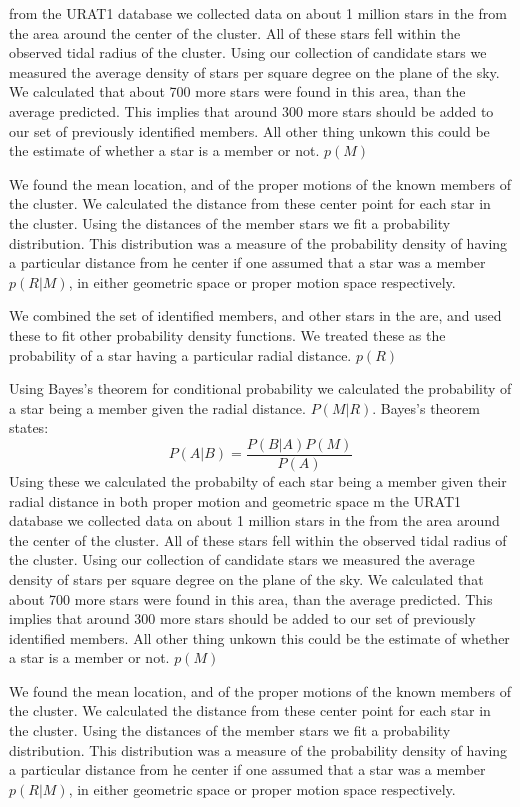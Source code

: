 \documentclass[12pt]{article}
\begin{document}
\huge{from the URAT1 database we collected data on about 1 million stars in the from the area around the center of the cluster.  All of these stars fell within the observed tidal radius of the cluster.  Using our collection of candidate stars we measured the average density of stars per square degree on the plane of the sky.  We calculated that about 700 more stars were found in this area, than the average predicted.  This implies that around 300 more stars should be added to our set of previously identified members.  All other thing unkown this could be the estimate of whether a star is a member or not. $p(M)$

We found the mean location, and of the proper motions of the known members of the cluster. We calculated the distance from these center point for each star in the cluster.  Using the distances of the member stars we fit a probability distribution.  This distribution was a measure of the probability density of having a particular distance from he center if one assumed that a star was a member $p(R|M)$, in either geometric space or proper motion space respectively.  

We combined the set of identified members, and other stars in the are, and used these to fit other probability density functions.  We treated these as the probability of a star having a particular radial distance. $p(R)$ 

Using Bayes's theorem for conditional probability we calculated the probability of a star being a member given the radial distance. $P(M|R)$. Bayes's theorem states:
\begin{equation}
P(A|B)=\frac{P(B|A)P(M)}{P(A)}
\end{equation}
Using these we calculated the probabilty of each star being a member given their radial distance in both proper motion and geometric space
m the URAT1 database we collected data on about 1 million stars in the from the area around the center of the cluster.  All of these stars fell within the observed tidal radius of the cluster.  Using our collection of candidate stars we measured the average density of stars per square degree on the plane of the sky.  We calculated that about 700 more stars were found in this area, than the average predicted.  This implies that around 300 more stars should be added to our set of previously identified members.  All other thing unkown this could be the estimate of whether a star is a member or not. $p(M)$

We found the mean location, and of the proper motions of the known members of the cluster. We calculated the distance from these center point for each star in the cluster.  Using the distances of the member stars we fit a probability distribution.  This distribution was a measure of the probability density of having a particular distance from he center if one assumed that a star was a member $p(R|M)$, in either geometric space or proper motion space respectively.  

}
\end{document}

